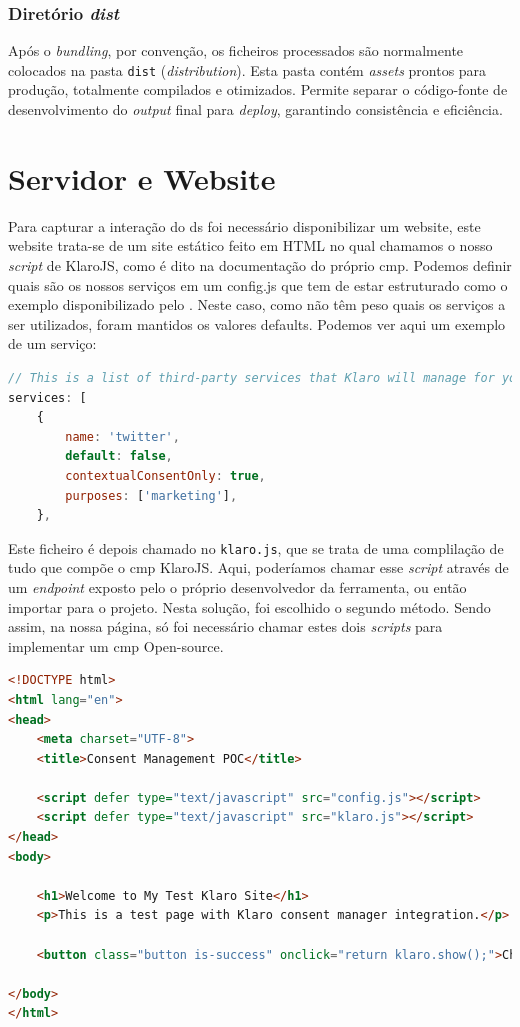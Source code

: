 \subsubsection{Diretório \textit{dist}}

Após o \textit{bundling}, por convenção, os ficheiros processados são normalmente colocados na pasta \texttt{dist} (\textit{distribution}). Esta pasta contém \textit{assets} prontos para produção, totalmente compilados e otimizados. Permite separar o código-fonte de desenvolvimento do \textit{output} final para \textit{deploy}, garantindo consistência e eficiência.

\section{Servidor e Website}

Para capturar a interação do \acrshort{ds} foi necessário disponibilizar um website, este website trata-se de um site estático feito em HTML no qual chamamos o nosso \textit{script} de KlaroJS, como é dito na documentação do próprio \acrshort{cmp}. Podemos definir quais são os nossos serviços em um config.js que tem de estar estruturado como o exemplo disponibilizado pelo \cite{gitklaro}. Neste caso, como não têm peso quais os serviços a ser utilizados, foram mantidos os valores defaults. Podemos ver aqui um exemplo de um serviço:

\begin{lstlisting}[language=Javascript]
// This is a list of third-party services that Klaro will manage for you.
services: [
	{
		name: 'twitter',
		default: false,
		contextualConsentOnly: true,
		purposes: ['marketing'],
	},
\end{lstlisting}

Este ficheiro é depois chamado no \texttt{klaro.js}, que se trata de uma complilação de tudo que compõe o \acrshort{cmp} KlaroJS. Aqui, poderíamos chamar esse \textit{script} através de um \textit{endpoint} exposto pelo o próprio desenvolvedor da ferramenta, ou então importar para o projeto. Nesta solução, foi escolhido o segundo método. Sendo assim, na nossa página, só foi necessário chamar estes dois \textit{scripts} para implementar um \acrshort{cmp} Open-source. 

\begin{lstlisting}[language=HTML]
<!DOCTYPE html>
<html lang="en">
<head>
    <meta charset="UTF-8">
    <title>Consent Management POC</title>

    <script defer type="text/javascript" src="config.js"></script>
    <script defer type="text/javascript" src="klaro.js"></script>
</head>
<body>

    <h1>Welcome to My Test Klaro Site</h1>
    <p>This is a test page with Klaro consent manager integration.</p>

    <button class="button is-success" onclick="return klaro.show();">Change consent settings</button>

</body>
</html>
\end{lstlisting}

